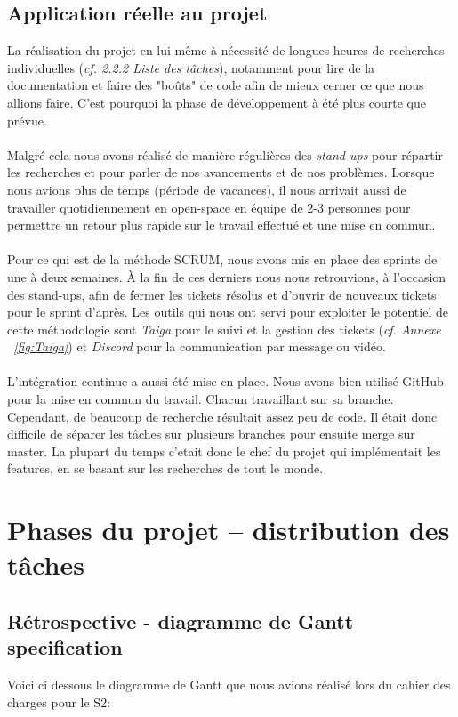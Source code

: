 \documentclass[french]{report}
\begin{document}
\subsection{Application réelle au projet}
La réalisation du projet en lui même à nécessité de longues heures de recherches
individuelles (\emph{cf. 2.2.2 Liste des tâches}), notamment pour lire de la documentation et faire des "boûts" de
code afin de mieux cerner ce que nous allions faire. C'est pourquoi la phase de développement à
été plus courte que prévue.
\\
\\
Malgré cela nous avons réalisé de manière régulières des \emph{stand-ups} pour
répartir les recherches et pour parler de nos avancements et de nos problèmes.
Lorsque nous avions
plus de temps (période de vacances), il nous arrivait aussi de travailler
quotidiennement en open-space en équipe de 2-3 personnes pour permettre un
retour plus rapide sur le travail effectué et une mise en commun.
\\
\\
Pour ce qui est de la méthode SCRUM, nous avons mis en place des sprints de une
à deux semaines. À la fin de ces derniers nous nous retrouvions, à
l'occasion des stand-ups, afin de fermer les tickets résolus et d’ouvrir de
nouveaux tickets pour le sprint d’après. Les outils qui nous ont servi
pour exploiter le potentiel de cette méthodologie
sont \emph{Taiga} pour le suivi et la gestion des tickets (\emph{cf. Annexe ~\ref{fig:Taiga}})
et \emph{Discord} pour la communication par message ou vidéo.
\\
\\
L'intégration continue a aussi été mise en place. Nous avons bien
utilisé GitHub pour la mise en commun du travail. Chacun travaillant sur sa
branche. Cependant, de beaucoup de recherche résultait assez peu de code. Il
était donc difficile de séparer les tâches sur plusieurs branches pour ensuite
merge sur master. La plupart du temps c'etait donc le chef du projet qui
implémentait les features, en se basant sur les recherches de tout le monde.

\section{Phases du projet – distribution des tâches}

\subsection{Rétrospective - diagramme de Gantt specification}
Voici ci dessous le diagramme de Gantt que nous avions réalisé lors du cahier
des charges pour le S2:
\end{document}
